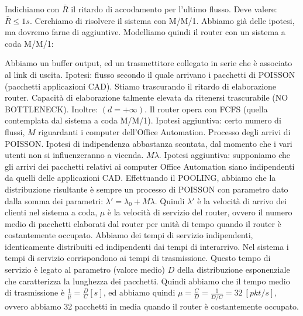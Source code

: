Indichiamo con $\bar{R}$ il ritardo di accodamento per l'ultimo flusso. Deve valere: $\bar{R} \leq 1s$. Cerchiamo di risolvere il sistema con M/M/1. Abbiamo già delle ipotesi, ma dovremo farne di aggiuntive. Modelliamo quindi il router con un sistema a coda M/M/1:

Abbiamo un buffer output, ed un trasmettitore collegato in serie che è associato al link di uscita. Ipotesi: flusso secondo il quale arrivano i pacchetti di POISSON (pacchetti applicazioni CAD). Stiamo trascurando il ritardo di elaborazione router.
Capacità di elaborazione talmente elevata da ritenersi trascurabile (NO BOTTLENECK). Inoltre: $(d = +\infty)$. Il router opera con FCFS (quella contemplata dal sistema a coda M/M/1). Ipotesi aggiuntiva: certo numero di flussi, $M$ riguardanti i computer dell'Office Automation. Processo degli arrivi di POISSON. Ipotesi di indipendenza abbastanza scontata, dal momento che i vari utenti non si influenzeranno a vicenda. $M\lambda$. Ipotesi aggiuntiva: supponiamo che gli arrivi dei pacchetti relativi ai computer Office Automation siano indipendenti da quelli delle applicazioni CAD. Effettuando il POOLING, abbiamo che la distribuzione risultante è sempre un processo di POISSON con parametro dato dalla somma dei parametri: $\lambda' = \lambda_0+M\lambda$. Quindi $\lambda'$ è la velocità di arrivo dei clienti nel sistema a coda, $\mu$ è la velocità di servizio del router, ovvero il numero medio di pacchetti elaborati dal router per unità di tempo quando il router è costantemente occupato. Abbiamo dei tempi di servizio indipendenti, identicamente distribuiti ed indipendenti dai tempi di interarrivo. Nel sistema i tempi di servizio corrispondono ai tempi di trasmissione. Questo tempo di servizio è legato al parametro (valore medio) $D$ della distribuzione esponenziale che caratterizza la lunghezza dei pacchetti. Quindi abbiamo che il tempo medio di trasmissione è $\frac{1}{\mu} = \frac{D}{C} [s]$, ed abbiamo quindi $\mu = \frac{C}{D} = \frac{1}{D/C} = 32\  [pkt/s]$, ovvero abbiamo 32 pacchetti in media quando il router è costantemente occupato.

